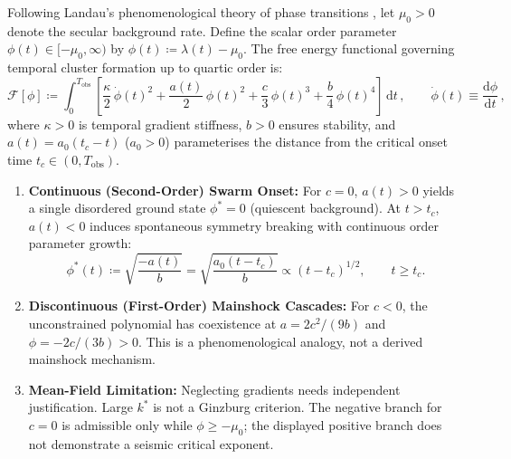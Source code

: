 \begin{proposition}
  \label{prop:landau_field_theory}
  Following Landau's phenomenological theory of phase transitions
  \parencite{landau1937}, let $\mu_0 > 0$ denote the secular
  background rate. Define the scalar order parameter $\phi(t) \in
  [-\mu_0, \infty)$ by $\phi(t) \coloneqq \lambda(t) - \mu_0$. The free
  energy functional governing temporal cluster formation up to
  quartic order is:
  \begin{equation}
    \mathcal{F}[\phi] \coloneqq \int_0^{T_{\mathrm{obs}}} \left[
      \frac{\kappa}{2}\,\dot{\phi}(t)^2
      + \frac{a(t)}{2}\,\phi(t)^2 + \frac{c}{3}\,\phi(t)^3 +
    \frac{b}{4}\,\phi(t)^4 \right] \,\mathrm{d}t\,, \qquad
    \dot{\phi}(t) \equiv \frac{\mathrm{d}\phi}{\mathrm{d}t}\,,
    \label{eq:landau_functional}
  \end{equation}
  where $\kappa > 0$ is temporal gradient stiffness, $b > 0$ ensures
  stability, and $a(t) = a_0(t_c - t)$ ($a_0 > 0$) parameterises the
  distance from the critical onset time $t_c \in (0, T_{\mathrm{obs}})$.
  \begin{enumerate}[label=(\roman*),noitemsep]
    \item \textbf{Continuous (Second-Order) Swarm Onset:} For $c =
      0$, $a(t) > 0$ yields a single disordered ground state $\phi^*
      = 0$ (quiescent background). At $t > t_c$, $a(t) < 0$ induces
      spontaneous symmetry breaking with continuous order parameter growth:
      \begin{equation}
        \phi^*(t) \coloneqq \sqrt{\frac{-a(t)}{b}} = \sqrt{\frac{a_0(t -
        t_c)}{b}} \propto (t - t_c)^{1/2}, \qquad t \ge t_c.
        \label{eq:critical_exponent}
      \end{equation}
    \item \textbf{Discontinuous (First-Order) Mainshock Cascades:}
      For $c<0$, the unconstrained polynomial has coexistence at
      $a=2c^2/(9b)$ and $\phi=-2c/(3b)>0$. This is a phenomenological
      analogy, not a derived mainshock mechanism.
    \item \textbf{Mean-Field Limitation:} Neglecting gradients needs
      independent justification. Large $k^*$ is not a Ginzburg criterion.
      The negative branch for $c=0$ is admissible only while
      $\phi\ge-\mu_0$; the displayed positive branch does not
      demonstrate a seismic critical exponent.
  \end{enumerate}
\end{proposition}

